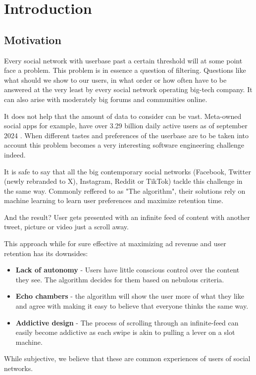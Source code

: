\chapter*{Introduction}

\section*{Motivation}

Every social network with userbase past a certain threshold will at some point face a problem.
This problem is in essence a question of filtering.
Questions like what should we show to our users, in what order or how often have to be answered at the very least by every social network operating big-tech company.
It can also arise with moderately big forums and communities online. 

It does not help that the amount of data to consider can be vast.
Meta-owned social apps for example, have over 3.29 billion daily active users as of september 2024 \cite{metaDau2024}.
When different tastes and preferences of the userbase are to be taken into account
this problem becomes a very interesting software engineering challenge indeed.

It is safe to say that all the big contemporary social networks (Facebook, Twitter (newly rebranded to X), Instagram, Reddit or TikTok)
tackle this challenge in the same way.
Commonly reffered to as "The algorithm",
their solutions rely on machine learning to learn user preferences and maximize retention time.

And the result? User gets presented with an infinite feed of content
with another tweet, picture or video just a scroll away.

This approach while for sure effective at maximizing ad revenue and user retention has its downsides:
\begin{itemize}
  \item \textbf{Lack of autonomy} - Users have little conscious control over the content they see. The algorithm decides for them based on nebulous criteria.
  \item \textbf{Echo chambers} - the algorithm will show the user more of what they like and agree with making it easy to believe that
  everyone thinks the same way.
  \item \textbf{Addictive design} - The process of scrolling through an infinite-feed can easily become addictive as each swipe is akin to pulling a lever on a slot machine.
\end{itemize}
While subjective, we believe that these are common experiences of users of social networks.

